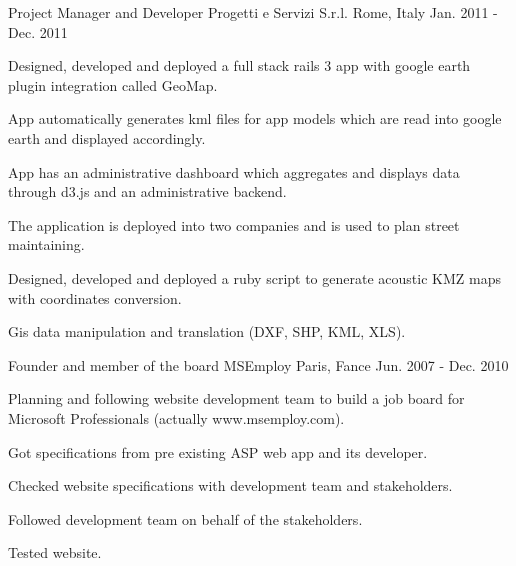 \begin{cventries}
  \cventry
    {Project Manager and Developer} %
    {Progetti e Servizi S.r.l.} %
    {Rome, Italy} %
    {Jan. 2011 - Dec. 2011} %
    {
      \begin{cvitems} %
        \item {Designed, developed and deployed a full stack rails 3 app with google earth plugin integration called GeoMap.}
        \item {App automatically generates kml files for app models which are read into google earth and displayed accordingly.}
        \item {App has an administrative dashboard which aggregates and displays data through d3.js and an administrative backend.}
        \item {The application is deployed into two companies and is used to plan street maintaining.}
        \item {Designed, developed and deployed a ruby script to generate acoustic KMZ maps with coordinates conversion.}
        \item {Gis data manipulation and translation (DXF, SHP, KML, XLS).}
      \end{cvitems}
    }

  \cventry
    {Founder and member of the board} %
    {MSEmploy} %
    {Paris, Fance} %
    {Jun. 2007 - Dec. 2010} %
    {
      \begin{cvitems} %
        \item {Planning and following website development team to build a job board for Microsoft Professionals (actually www.msemploy.com).}
        \item {Got specifications from pre existing ASP web app and its developer.}
        \item {Checked website specifications with development team and stakeholders.}
        \item {Followed development team on behalf of the stakeholders.}
        \item {Tested website.}
      \end{cvitems}
    }


\end{cventries}

